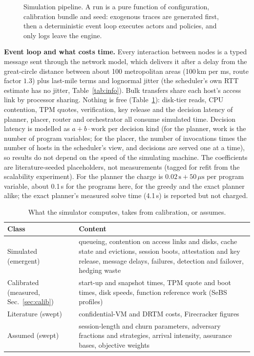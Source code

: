 \begin{figure}[t]
\centering
\resizebox{\textwidth}{!}{}
\caption{Simulation pipeline. A run is a pure function of configuration, calibration bundle and seed: exogenous traces are generated first, then a deterministic event loop executes actors and policies, and only logs leave the engine.}
\label{fig:sim}
\end{figure}

\textbf{Event loop and what costs time.} Every interaction between nodes is a typed message sent through the network model, which delivers it after a delay from the great-circle distance between about 100 metropolitan areas (100\,km per ms, route factor $1.3$) plus last-mile terms and lognormal jitter (the scheduler's own RTT estimate has no jitter, Table~\ref{tab:info}). Bulk transfers share each host's access link by processor sharing.
Nothing is free (Table~\ref{tab:simwhat}): disk-tier reads, CPU contention, TPM quotes, verification, key release and the decision latency of planner, placer, router and orchestrator all consume simulated time. Decision latency is modelled as $a+b\cdot\text{work}$ per decision kind (for the planner, work is the number of program variables; for the placer, the number of invocations times the number of hosts in the scheduler's view, and decisions are served one at a time), so results do not depend on the speed of the simulating machine. The coefficients are literature-seeded placeholders, not measurements (tagged for refit from the scalability experiment). For the planner the charge is $0.02\,\text{s}+50\,\mu\text{s}$ per program variable, about 0.1\,s for the programs here, for the greedy and the exact planner alike; the exact planner's measured solve time (4.1\,s) is reported but not charged.

\begin{table}[t]
\caption{What the simulator computes, takes from calibration, or assumes.}
\label{tab:simwhat}
\centering\scriptsize
\setlength{\tabcolsep}{3pt}
\begin{tabular}{@{}p{1.8cm}p{6.4cm}@{}}
\toprule
Class & Content \\
\midrule
Simulated (emergent) & queueing, contention on access links and disks, cache state and evictions, session boots, attestation and key release, message delays, failures, detection and failover, hedging waste \\
Calibrated (measured, Sec.~\ref{sec:calib}) & start-up and snapshot times, TPM quote and boot times, disk speeds, function reference work (SeBS profiles) \\
Literature (swept) & confidential-VM and DRTM costs, Firecracker figures \\
Assumed (swept) & session-length and churn parameters, adversary fractions and strategies, arrival intensity, assurance bases, objective weights \\
\bottomrule
\end{tabular}
\end{table}

